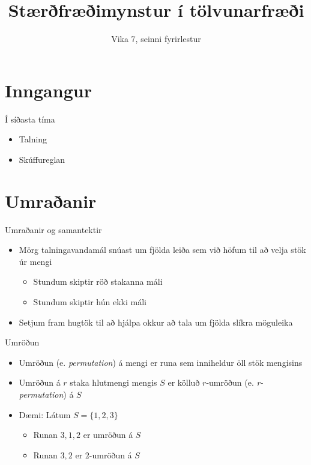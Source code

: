 \documentclass[handout]{beamer}
\title{Stærðfræðimynstur í tölvunarfræði}
\subtitle{Vika 7, seinni fyrirlestur}
\begin{document}
\begin{frame}
\titlepage
\end{frame}


\section{Inngangur}

\begin{frame}{Í síðasta tíma}
\begin{itemize}
 \item Talning
 \item Skúffureglan
\end{itemize}
\end{frame}

\section{Umraðanir}

\begin{frame}{Umraðanir og samantektir}
\begin{itemize}
 \item Mörg talningavandamál snúast um fjölda leiða sem við höfum til að velja stök úr mengi
 \begin{itemize}
  \item Stundum skiptir röð stakanna máli
  \item Stundum skiptir hún ekki máli
 \end{itemize}
 \item Setjum fram hugtök til að hjálpa okkur að tala um fjölda slíkra möguleika
\end{itemize}
\end{frame}

\begin{frame}{Umröðun}
\begin{itemize}
 \item Umröðun (e. \emph{permutation}) á mengi er runa sem inniheldur öll stök mengisins
 \item Umröðun á $r$ staka hlutmengi mengis $S$ er kölluð $r$-umröðun (e. \emph{r-permutation}) á $S$
 \item Dæmi: Látum $S = \{1, 2, 3\}$
 \begin{itemize}
  \item Runan $3, 1, 2$ er umröðun á $S$
  \item Runan $3, 2$ er $2$-umröðun á $S$
 \end{itemize}
\end{itemize}
\end{frame}
\end{document}
